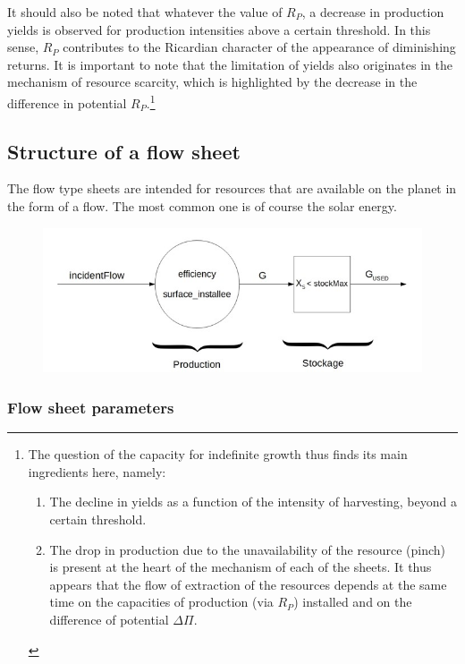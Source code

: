 \documentclass[12pt,a4paper]{article}%
\begin{document}
It should also be noted that whatever the value of $R_{P}$, a decrease in production yields is observed for production intensities above a certain threshold. In this sense, $R_{P}$ contributes to the Ricardian character of the appearance of diminishing returns.  It is important to note that the limitation of yields also originates in the mechanism of resource scarcity, which is highlighted by the decrease in the difference in potential $R_{P}$.\footnote{
	The question of the capacity for indefinite growth thus finds its main ingredients here, namely:
	\begin{enumerate}
		\item The decline in yields as a function of the intensity of harvesting, beyond a certain threshold.
		\item The drop in production due to the unavailability of the resource (pinch) is present at the heart of the mechanism of each of the sheets. It thus appears that the flow of extraction of the resources depends at the same time on the capacities of production (via $R_{P}$) installed and on the difference of potential $\Delta\Pi$.
	\end{enumerate}}

\subsection{Structure of a flow sheet}

The flow type sheets are intended for resources that are available on the planet in the form of a flow. The most common one is of course the solar energy.

\begin{figure}[h]
\centering
\includegraphics[width=1.0\textwidth]{figures/FeuilleFlux.jpg}\end{figure}

\subsubsection{Flow sheet parameters}
\end{document}
